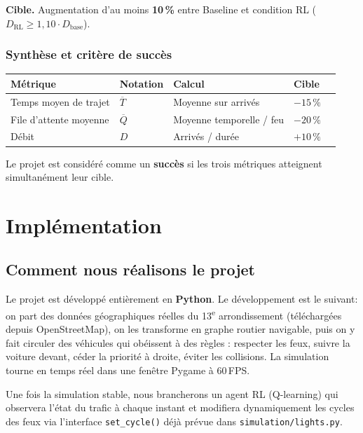 \documentclass[a4paper,10pt]{article}
\begin{document}
\textbf{Cible.} Augmentation d'au moins \textbf{10\,\%}
entre Baseline et condition RL ($D_{\text{RL}} \geq 1{,}10 \cdot D_{\text{base}}$).

\subsubsection*{Synth\`{e}se et crit\`{e}re de succ\`{e}s}

\begin{tabular}{lllll}
\toprule
\textbf{M\'{e}trique} & \textbf{Notation} & \textbf{Calcul} & \textbf{Cible} \\
\midrule
Temps moyen de trajet
  & $\overline{T}$
  & Moyenne sur arriv\'{e}s
  & $-15\,\%$ \\
File d'attente moyenne
  & $\overline{Q}$
  & Moyenne temporelle / feu
  & $-20\,\%$ \\
D\'{e}bit
  & $D$
  & Arriv\'{e}s / dur\'{e}e
  & $+10\,\%$ \\
\bottomrule
\end{tabular}

\medskip
Le projet est consid\'{e}r\'{e} comme un \textbf{succ\`{e}s} si les trois m\'{e}triques
atteignent simultan\'{e}ment leur cible.


\section{Impl\'{e}mentation}


\subsection{Comment nous r\'{e}alisons le projet}

Le projet est d\'{e}velopp\'{e} enti\`{e}rement en \textbf{Python}.
Le d\'{e}veloppement est le suivant: on part des donn\'{e}es
g\'{e}ographiques r\'{e}elles du 13\textsuperscript{e} arrondissement (t\'{e}l\'{e}charg\'{e}es
depuis OpenStreetMap), on les transforme en graphe routier navigable,
puis on y fait circuler des v\'{e}hicules qui ob\'{e}issent \`{a} des r\`{e}gles : respecter les feux, suivre la voiture devant,
c\'{e}der la priorit\'{e} \`{a} droite, \'{e}viter les collisions.
La simulation tourne en temps r\'{e}el dans une fen\^{e}tre Pygame \`{a} 60\,FPS.

Une fois la simulation stable, nous brancherons un agent RL (Q-learning)
qui observera l'\'{e}tat du trafic \`{a} chaque instant et modifiera dynamiquement
les cycles des feux via l'interface \texttt{set\_cycle()} d\'{e}j\`{a} pr\'{e}vue
dans
\texttt{simulation/lights.py}.
\end{document}
